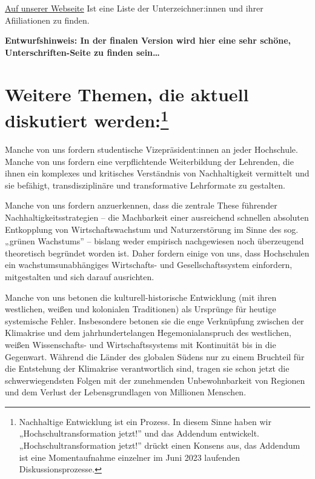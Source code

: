 \documentclass[DIV=12]{scrartcl}
\begin{document}
\href{https://hochschultransformation.jetzt/unterzeichnende.html}{\underline{Auf unserer Webseite}} Ist eine Liste der Unterzeichner:innen
und ihrer Afiiliationen zu finden.

\textbf{Entwurfshinweis: In der finalen Version wird hier eine sehr schöne, Unterschriften-Seite zu finden sein…}

\newpage

\hypertarget{weitere-themen-die-aktuell-diskutiert-werden1}{%
\section*{Weitere Themen, die aktuell diskutiert
werden:\footnote{Nachhaltige Entwicklung ist ein Prozess. In diesem Sinne
  haben wir „Hochschultransformation jetzt!'' und das Addendum
  entwickelt. „Hochschultransformation jetzt!'' drückt einen Konsens
  aus, das Addendum ist eine Momentaufnahme einzelner im Juni 2023
  laufenden Diskussionsprozesse.}}
 \label{weitere-themen-die-aktuell-diskutiert-werden1}}

Manche von uns fordern studentische Vizepräsident:innen an jeder
Hochschule.
Manche von uns fordern eine verpflichtende Weiterbildung der Lehrenden,
die ihnen ein komplexes und kritisches Verständnis von Nachhaltigkeit
vermittelt und sie befähigt, transdisziplinäre und transformative
Lehrformate zu gestalten.

Manche von uns fordern anzuerkennen, dass die zentrale These führender
Nachhaltigkeitsstrategien -- die Machbarkeit einer ausreichend schnellen
absoluten Entkopplung von Wirtschaftswachstum und Naturzerstörung im
Sinne des sog. „grünen Wachstums'' -- bislang weder empirisch
nachgewiesen noch überzeugend theoretisch begründet worden ist. Daher
fordern einige von uns, dass Hochschulen ein wachstumsunabhängiges
Wirtschafts- und Gesellschaftssystem einfordern, mitgestalten und sich
darauf ausrichten.

Manche von uns betonen die kulturell-historische Entwicklung (mit ihren
westlichen, weißen und kolonialen Traditionen) als Ursprünge für heutige
systemische Fehler. Insbesondere betonen sie die enge Verknüpfung
zwischen der Klimakrise und dem jahrhundertelangen Hegemonialanspruch
des westlichen, weißen Wissenschafts- und Wirtschaftssystems mit
Kontinuität bis in die Gegenwart. Während die Länder des globalen Südens
nur zu einem Bruchteil für die Entstehung der Klimakrise verantwortlich
sind, tragen sie schon jetzt die schwerwiegendsten Folgen mit der
zunehmenden Unbewohnbarkeit von Regionen und dem Verlust der
Lebensgrundlagen von Millionen Menschen.
\end{document}
